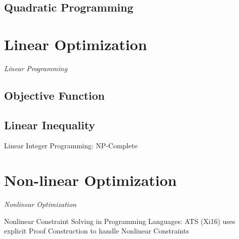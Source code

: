 \subsection{Quadratic Programming}\label{sec:quadratic_programming}



\section{Linear Optimization}\label{sec:linear_optimization}

\emph{Linear Programming}



\subsection{Objective Function}\label{sec:objective_function}

\subsection{Linear Inequality}\label{sec:linear_inequality}

Linear Integer Programming: NP-Complete



\section{Non-linear Optimization}\label{sec:nonlinear_optimization}

\emph{Nonlinear Optimization}

Nonlinear Constraint Solving in Programming Languages: ATS (Xi16) uses
explicit Proof Construction to handle Nonlinear Constraints



